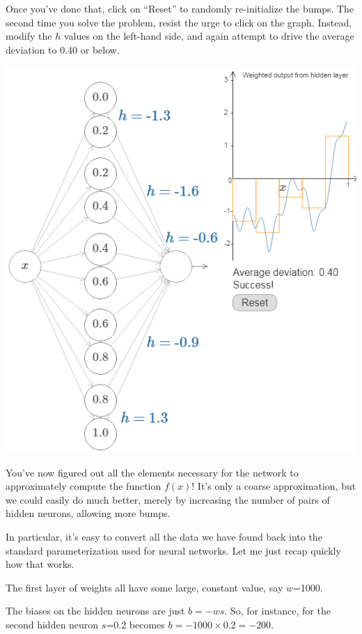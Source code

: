 Once you've done that, click on ``Reset'' to randomly re-initialize the bumps. The second time you solve the problem, resist the urge to click on the graph. Instead, modify the $h$ values on the left-hand side, and again attempt to drive the average deviation to 0.40 or below.

{\centering \includegraphics[width=\textwidth,]{pic/wigglyfn19} \par}

You've now figured out all the elements necessary for the network to approximately compute the function $f(x)$! It's only a coarse approximation, but we could easily do much better, merely by increasing the number of pairs of hidden neurons, allowing more bumps.

In particular, it's easy to convert all the data we have found back into the standard parameterization used for neural networks. Let me just recap quickly how that works.

The first layer of weights all have some large, constant value, say $w$=1000.

The biases on the hidden neurons are just $b=-ws$. So, for instance, for the second hidden neuron $s$=0.2 becomes $b=-1000\times 0.2=-200$.

